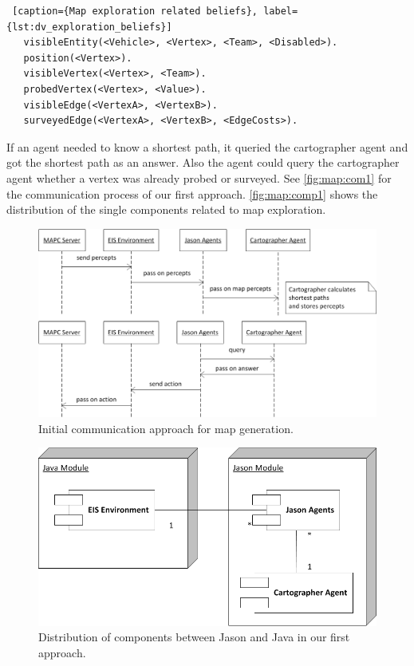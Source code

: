 \begin{lstlisting} [caption={Map exploration related beliefs}, label={lst:dv_exploration_beliefs}]
   visibleEntity(<Vehicle>, <Vertex>, <Team>, <Disabled>).
   position(<Vertex>).
   visibleVertex(<Vertex>, <Team>).
   probedVertex(<Vertex>, <Value>).
   visibleEdge(<VertexA>, <VertexB>).
   surveyedEdge(<VertexA>, <VertexB>, <EdgeCosts>).
\end{lstlisting}

If an agent needed to know a shortest path, it queried the cartographer agent and got the shortest path as an answer.
Also the agent could query the cartographer agent whether a vertex was already probed or surveyed.
See \autoref{fig:map:com1} for the communication process of our first approach.
\autoref{fig:map:comp1} shows the distribution of the single components related to map exploration.
\begin{figure}
  \centering
  \includegraphics[width=\linewidth]{images/map_com_1.png}
  \caption{Initial communication approach for map generation.}
  \label{fig:map:com1}
\end{figure}

\begin{figure}
  \centering
  \includegraphics[width=\linewidth]{images/map_comp_1.png}
  \caption{Distribution of components between Jason and Java in our first approach.}
  \label{fig:map:comp1}
\end{figure}

